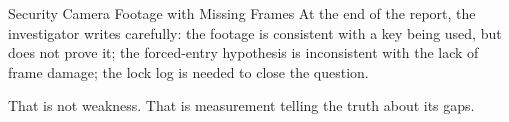 \begin{coda}{Security Camera Footage with Missing Frames}
At the end of the report, the investigator writes carefully: the footage is
consistent with a key being used, but does not prove it; the forced-entry
hypothesis is inconsistent with the lack of frame damage; the lock log is needed
to close the question.

That is not weakness. That is measurement telling the truth about its gaps.

\end{coda}

